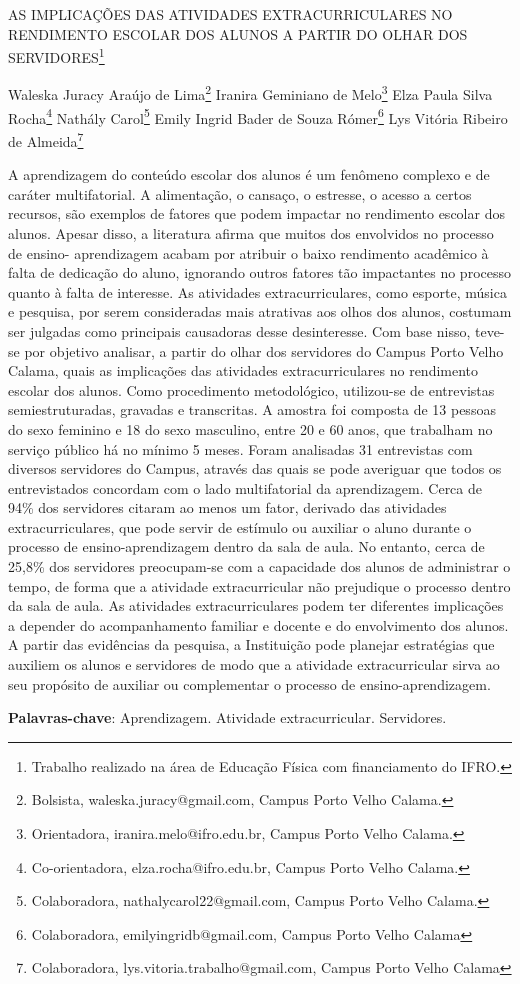\documentclass[article,12pt,onesidea,4paper,english,brazil]{abntex2}
\begin{document}
	
	
	\frenchspacing 
	
	\begin{center}
		\LARGE AS IMPLICAÇÕES DAS ATIVIDADES EXTRACURRICULARES NO RENDIMENTO
		ESCOLAR DOS ALUNOS A PARTIR DO OLHAR DOS SERVIDORES\footnote{Trabalho realizado na área de Educação Física com financiamento do IFRO.}
		
		\normalsize
		Waleska Juracy Araújo de Lima\footnote{Bolsista, waleska.juracy@gmail.com, Campus Porto Velho Calama.} 
		Iranira Geminiano de Melo\footnote{Orientadora, iranira.melo@ifro.edu.br, Campus Porto Velho Calama.} 
		Elza Paula Silva Rocha\footnote{Co-orientadora, elza.rocha@ifro.edu.br, Campus Porto Velho Calama.} 
		Nathály Carol\footnote{Colaboradora, nathalycarol22@gmail.com, Campus Porto Velho Calama.}
		Emily Ingrid Bader de Souza Rómer\footnote{Colaboradora, emilyingridb@gmail.com, Campus Porto Velho Calama}
		Lys Vitória Ribeiro de Almeida\footnote{Colaboradora, lys.vitoria.trabalho@gmail.com, Campus Porto Velho Calama} 
	\end{center}
	
	\noindent A aprendizagem do conteúdo escolar dos alunos é um fenômeno complexo e de
	caráter multifatorial. A alimentação, o cansaço, o estresse, o acesso a certos recursos,
	são exemplos de fatores que podem impactar no rendimento escolar dos alunos.	
	Apesar disso, a literatura afirma que muitos dos envolvidos no processo de ensino-
	aprendizagem acabam por atribuir o baixo rendimento acadêmico à falta de dedicação	
	do aluno, ignorando outros fatores tão impactantes no processo quanto à falta de
	interesse. As atividades extracurriculares, como esporte, música e pesquisa, por
	serem consideradas mais atrativas aos olhos dos alunos, costumam ser julgadas
	como principais causadoras desse desinteresse. Com base nisso, teve-se por objetivo
	analisar, a partir do olhar dos servidores do Campus Porto Velho Calama, quais as
	implicações das atividades extracurriculares no rendimento escolar dos alunos. Como
	procedimento metodológico, utilizou-se de entrevistas semiestruturadas, gravadas e
	transcritas. A amostra foi composta de 13 pessoas do sexo feminino e 18 do sexo
	masculino, entre 20 e 60 anos, que trabalham no serviço público há no mínimo 5
	meses. Foram analisadas 31 entrevistas com diversos servidores do Campus, através
	das quais se pode averiguar que todos os entrevistados concordam com o lado
	multifatorial da aprendizagem. Cerca de 94\% dos servidores citaram ao menos um
	fator, derivado das atividades extracurriculares, que pode servir de estímulo ou auxiliar
	o aluno durante o processo de ensino-aprendizagem dentro da sala de aula. No
	entanto, cerca de 25,8\% dos servidores preocupam-se com a capacidade dos alunos
	de administrar o tempo, de forma que a atividade extracurricular não prejudique o
	processo dentro da sala de aula. As atividades extracurriculares podem ter diferentes
	implicações a depender do acompanhamento familiar e docente e do envolvimento
	dos alunos. A partir das evidências da pesquisa, a Instituição pode planejar estratégias
	que auxiliem os alunos e servidores de modo que a atividade extracurricular sirva ao
	seu propósito de auxiliar ou complementar o processo de ensino-aprendizagem.
	
	\vspace{\onelineskip}
	
	\noindent
	\textbf{Palavras-chave}: Aprendizagem. Atividade extracurricular. Servidores.
	
\end{document}
